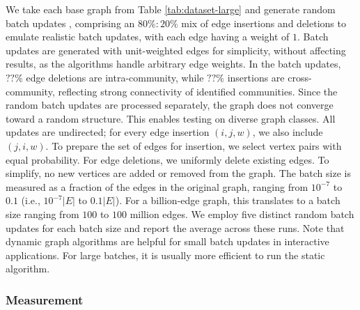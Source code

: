 We take each base graph from Table \ref{tab:dataset-large} and generate random batch updates \cite{com-zarayeneh21}, comprising an $80\% : 20\%$ mix of edge insertions and deletions to emulate realistic batch updates, with each edge having a weight of $1$. Batch updates are generated with unit-weighted edges for simplicity, without affecting results, as the algorithms handle arbitrary edge weights. In the batch updates, $??\%$ edge deletions are intra-community, while $??\%$ insertions are cross-community, reflecting strong connectivity of identified communities. Since the random batch updates are processed separately, the graph does not converge toward a random structure. This enables testing on diverse graph classes. All updates are undirected; for every edge insertion $(i, j, w)$, we also include $(j, i, w)$. To prepare the set of edges for insertion, we select vertex pairs with equal probability. For edge deletions, we uniformly delete existing edges. To simplify, no new vertices are added or removed from the graph. The batch size is measured as a fraction of the edges in the original graph, ranging from $10^{-7}$ to $0.1$ (i.e., $10^{-7}|E|$ to $0.1|E|$). For a billion-edge graph, this translates to a batch size ranging from $100$ to $100$ million edges. We employ five distinct random batch updates for each batch size and report the average across these runs. Note that dynamic graph algorithms are helpful for small batch updates in interactive applications. For large batches, it is usually more efficient to run the static algorithm.


\subsubsection{Measurement}
\label{sec:measurement}

